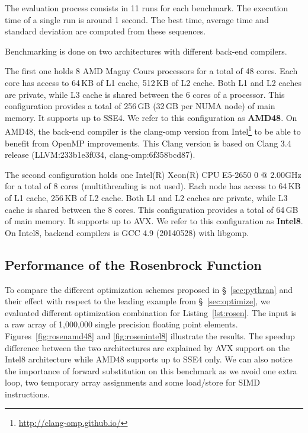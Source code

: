 \documentclass[10pt, preprint]{sigplanconf}
\begin{document}
The evaluation process consists in  11 runs for each benchmark. The execution
time of a single run is around 1 second.  The best time, average time and
standard deviation are computed from these sequences.

Benchmarking is done on two architectures with different back-end compilers.

The first one holds 8 AMD Magny Cours processors for a
total of 48 cores. Each core has access to 64\,KB of L1 cache,
512\,KB of L2 cache. Both L1 and L2 caches are private, while L3 cache
is shared between the 6 cores of a processor. This configuration
provides a total of 256\,GB (32\,GB per NUMA node) of main memory. It supports
up to SSE4. We refer to this configuration as \textbf{AMD48}.
On AMD48, the back-end compiler is the clang-omp
version from Intel\footnote{\url{http://clang-omp.github.io/}} to be able to
benefit from OpenMP improvements. This Clang version is based on Clang 3.4
release (LLVM:233b1e3f034, clang-omp:6f358bcd87).

The second configuration holds one Intel(R) Xeon(R) CPU E5-2650 0 @ 2.00GHz for a total of
8 cores (multithreading is not used). Each node has access to 64\,KB of L1
cache, 256\,KB of L2 cache. Both L1 and L2 caches are private, while L3 cache
is shared between the 8 cores. This configuration provides a total of 64\,GB of
main memory. It supports up to AVX. We refer to this configuration as
\textbf{Intel8}.
On Intel8, backend compilers is GCC 4.9 (20140528) with libgomp.


\subsection{Performance of the Rosenbrock Function}

To compare the different optimization schemes proposed in \S~\ref{sec:pythran} and their effect with respect to the leading example from \S~\ref{sec:optimize}, we evaluated different optimization combination for Listing~\ref{lst:rosen}. The input is a raw array of 1,000,000 single precision floating point elements.
Figures~\ref{fig:rosenamd48} and \ref{fig:rosenintel8} illustrate the results.
The speedup difference between the two architectures are explained by AVX support on
the Intel8 architecture while AMD48 supports up to SSE4 only.
We can also notice the importance of forward substitution on this benchmark as
we avoid one extra loop, two temporary array assignments and some load/store for
SIMD instructions.
\end{document}
